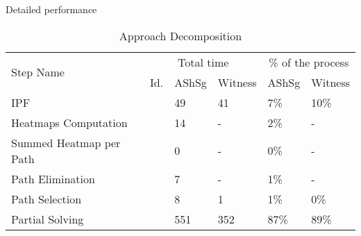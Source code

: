\begin{frame}{Detailed performance}
    \tiny
    \begin{table}[]
        \centering
        \caption{Approach Decomposition}\label{tbl:approach_decomposition}
        \begin{tabular}{@{}llllll@{}}
        \toprule
        \multicolumn{1}{l|}{\multirow{2}{*}{Step Name}} & \multicolumn{3}{c|}{Total time} & \multicolumn{2}{c}{\% of the process} \\ \cmidrule(l){2-6}  
        \multicolumn{1}{l|}{} & \multicolumn{1}{l|}{Id.} & \multicolumn{1}{c}{AShSg} & \multicolumn{1}{c|}{Witness} & \multicolumn{1}{c}{AShSg} & Witness \\ \midrule
        IPF & \cellcolor{lightgrey} & 49 & 41  &7\% &10\%  \\
        Heatmaps Computation & \cellcolor{lightgrey} & 14 &  - &2\% & - \\
        Summed Heatmap per Path & \cellcolor{lightgrey} & 0 &  - &0\% & - \\
        Path Elimination & \cellcolor{lightgrey} & 7 &  - &1\% & - \\
        Path Selection & \cellcolor{lightgrey} & 8 & 1  &1\% &0\%  \\
        Partial Solving & \cellcolor{lightgrey} & 551 & 352  &87\% &89\%  \\
        \end{tabular}
        \end{table}
\end{frame}

